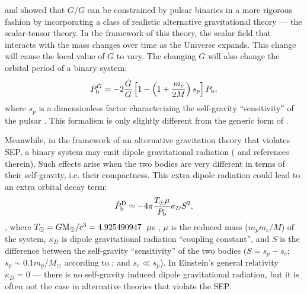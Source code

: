 \citealt{lwj+09} and \citealt{fwe+12} showed that $\dot{G}/G$ can be constrained by pulsar
binaries in a more rigorous fashion
by incorporating a class of realistic alternative gravitational theory --- the 
scalar-tensor theory.
In the framework of this theory,
the scalar field that interacts with the mass changes over time as the
Universe expands. This change will cause the local value of
$G$ to vary. The changing $G$ will also change the orbital period of a binary system:
\begin{equation}
\dot{P}_{\rm b}^{\dot{G}} = -2 \frac{\dot{G}}{G}
\left[1-\left( 1+\frac{m_c}{2M}\right) s_p\right]P_{\rm b},
\end{equation}
where $s_p$ is a dimensionless factor characterizing the self-gravity
``sensitivity'' of the pulsar \citep{nor90}.
This formalism is only slightly different from the generic form of
\citet{dgt88}.

Meanwhile, in the framework of an alternative gravitation theory that violates
SEP, a binary system may emit dipole gravitational radiation (\citealt{Will93, Will01, lwj+09, fwe+12} and references
therein). Such effects arise when the two bodies are very different in terms
of their self-gravity, i.e.  their compactness.
This extra dipole radiation could lead to an extra orbital decay term:
\begin{equation}
\dot{P}_{\rm b}^{\rm D} \simeq -4\pi\frac{T_{\odot}\mu}{P_{\rm b}}\kappa_D S^2,
\end{equation}
\citep{lwj+09}, where $T_{\odot}=G{\rm M_{\odot}}/c^3=4.925490947$~${\rm
\mu}$s \citep{lk05}, $\mu$ is the reduced mass ($m_pm_c/M$) of the system, $\kappa_D$ is dipole
gravitational radiation ``coupling constant'', and $S$ is the difference
between the self-gravity ``sensitivity'' of the two bodies ($S = s_p - s_c$;
$s_p\sim0.1m_p/M_{\odot}$ according to \citealt{de92} ; and $s_c\ll s_p$).
In Einstein's general relativity $\kappa_D=0$ --- there is no self-gravity induced
dipole gravitational radiation, but it is often not the case in alternative
theories that violate the SEP.

